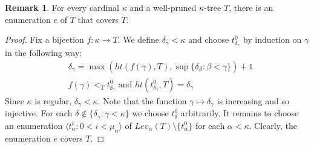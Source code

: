 \documentclass[11pt]{amsart}
\theoremstyle{plain}
\theoremstyle{definition} %
\newtheorem{remark}[theorem]{Remark}
\theoremstyle{remark}
\begin{document}
\begin{remark}
For every cardinal $\kappa$ and a well-pruned $\kappa$-tree $T$, there is an enumeration $e$ of $T$ that covers $T$.
\end{remark}




\begin{proof}
Fix a bijection $f:\kappa \to T$. We define $\delta_\gamma<\kappa$ and choose $t^0_{\delta_\gamma}$ by induction on $\gamma$ in the following way:
\begin{align*}
&\delta_\gamma=\max(ht(f(\gamma),T),\sup\{\delta_\beta:\beta<\gamma\})+1 \\
&f(\gamma) <_T t^0_{\delta_\gamma} \text{ and } ht(t^0_{\delta_\gamma},T)=\delta_\gamma
\end{align*}
  Since $\kappa$ is regular, $\delta_\gamma<\kappa$. Note that the function $\gamma \mapsto \delta_\gamma$ is increasing and so injective. For each $\delta \notin \{\delta_\gamma:\gamma<\kappa\}$ we choose $t^0_\delta$ arbitrarily. It remains to choose an enumeration $\langle t^i_\alpha:0<i<\mu_\alpha \rangle$ of $Lev_\alpha(T) \setminus \{t^0_\alpha\}$ for each $\alpha<\kappa$. Clearly, the enumeration $e$ covers $T$.
\end{proof}

\end{document}
